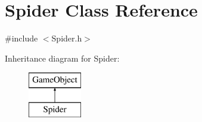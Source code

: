 \hypertarget{class_spider}{}\section{Spider Class Reference}
\label{class_spider}


{\ttfamily \#include $<$Spider.\+h$>$}

Inheritance diagram for Spider\+:\begin{figure}[H]
\begin{center}
\leavevmode
\includegraphics[height=2.000000cm]{class_spider}
\end{center}
\end{figure}
